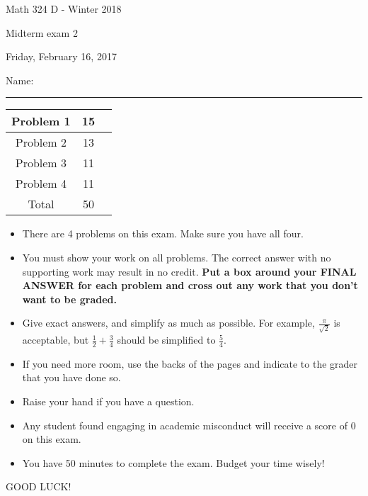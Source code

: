 \documentclass[12 pt]{report}
\begin{document}
\noindent \vfill \noindent \large

\centerline{Math 324 D  - Winter 2018}

\centerline{Midterm exam 2}

\centerline{Friday, February 16, 2017}

\normalsize

\vfill
\medskip
Name: \rule{10cm}{1pt}

\bigskip

\vfill
\begin{center}
{\large
\begin{tabular}{||c|c|r||}
\hline Problem 1 & 15 & \hspace{10mm} \hfill \\
\hline Problem 2 & 13 & \hspace{10mm} \hfill \\
\hline Problem 3 & 11 & \hspace{10mm} \hfill \\
\hline Problem 4 & 11 & \hspace{10mm} \hfill \\
\hline Total & 50 & \hspace{10mm} \hfill \\
\hline
\end{tabular}
}
\end{center}
\vfill
\begin{itemize}
\item There are 4 problems on this exam. Make sure you have all four.
\item You must show your work on all problems.  The correct answer
with no supporting work may result in no credit. \textbf{Put a box
around your FINAL ANSWER for each problem and cross out any work
that you don't want to be graded.} 
\item Give exact answers, and simplify as much as possible. 
For example, $\frac{\pi}{\sqrt{2}}$ is acceptable, but $\frac{1}{2} + \frac{3}{4}$
should be simplified to $\frac{5}{4}$.   

\item If you need more room, use the backs
of the pages and indicate to the grader that you have done so.
\item Raise your hand if you have a question.
\item Any student found engaging in academic misconduct will receive
a score of 0 on this exam.
\item You have 50 minutes to complete the exam.  Budget your time wisely! \\
\end{itemize}
\vfill
\begin{center}GOOD LUCK!\end{center}
\end{document}
